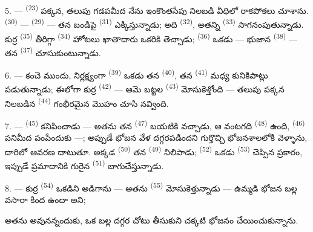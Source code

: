5. ---  \textsuperscript{(23)} పక్కన, తలుపు గడపమీద నేను ఇంకొంతసేపు
నిలబడి వీధిలో రాకపోకలు చూశాను.  \textsuperscript{(30)} —
 \textsuperscript{(29)} — తన బండిపై 
\textsuperscript{(31)} ఎక్కిస్తున్నాడు; అది  \textsuperscript{(32)},
అతన్ని  \textsuperscript{(33)} సాగనంపుతున్నాడు. కుర్ర
 \textsuperscript{(35)} తీరిగ్గా 
\textsuperscript{(34)} హోటలు ఖాతాదారు ఒకరికి తెచ్చాడు; 
\textsuperscript{(36)} ఒకడు — భుజాన  \textsuperscript{(38)} — తన
 \textsuperscript{(37)} చూసుకుంటున్నాడు.

\VUsaut{4.0mm}
\VUsaut{3.0mm}

6. --- కంచె ముందు, నిర్లక్ష్యంగా  \textsuperscript{(39)} ఒకడు తన
 \textsuperscript{(40)}, తన 
\textsuperscript{(41)} మధ్య కునికిపాట్లు పడుతున్నాడు; ఈలోగా కుర్ర
 \textsuperscript{(42)} — ఆమె బట్టల 
\textsuperscript{(43)} మోసుకెళ్తోంది — తలుపు పక్కన నిలబడిన 
\textsuperscript{(44)} గంభీరమైన మొహం చూసి నవ్వింది.

7. ---  \textsuperscript{(45)} కనిపించాడు — అతను తన 
\textsuperscript{(47)} బయటికి వచ్చాడు, ఆ వంటగది  \textsuperscript{(48)}
ఉంది,  \textsuperscript{(46)} పనిమీద పంపేందుకు —; అప్పుడే భోజన
వేళ దగ్గరపడిందని గుర్తొచ్చి భోజనశాలలోకి వెళ్ళాను, దారిలో ఆవరణ దాటుతూ. అక్కడ
 \textsuperscript{(50)} తన  \textsuperscript{(49)}
నిలిపాడు;  \textsuperscript{(52)} ఒకడు 
\textsuperscript{(53)} చెప్పిన ప్రకారం, ఇప్పుడే ప్రమాదానికి గురైన
 \textsuperscript{(51)} బాగుచేస్తున్నాడు.

8. --- కుర్ర  \textsuperscript{(54)} ఒకడిని అడిగాను — అతను
 \textsuperscript{(55)} మోసుకెళ్తున్నాడు — ఉమ్మడి భోజన బల్ల వసారా
కింద ఉందా అని;

అతను అవునన్నందుకు, ఒక బల్ల దగ్గర చోటు తీసుకుని చక్కటి భోజనం చేయించుకున్నాను.


